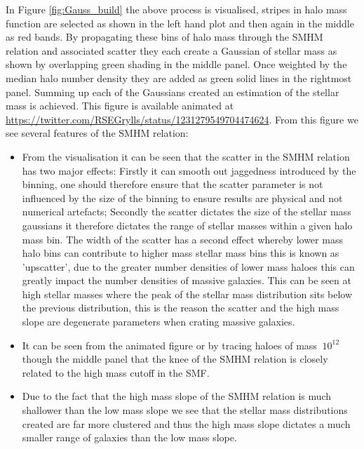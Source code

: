 In Figure \ref{fig:Gauss_build} the above process is visualised, stripes in halo mass function are selected as shown in the left hand plot and then again in the middle as red bands. By propagating these bins of halo mass through the SMHM relation and associated scatter they each create a Gaussian of stellar mass as shown by overlapping green shading in the middle panel. Once weighted by the median halo number density they are added as green solid lines in the rightmost panel. Summing up each of the Gaussians created an estimation of the stellar mass is achieved. This figure is available animated at \url{https://twitter.com/RSEGrylls/status/1231279549704474624}. From this figure we see several features of the SMHM relation:
\begin{itemize}
    \item From the visualisation it can be seen that the scatter in the SMHM relation has two major effects: Firstly it can smooth out jaggedness introduced by the binning, one should therefore ensure that the scatter parameter is not influenced by the size of the binning to ensure results are physical and not numerical artefacts; Secondly the scatter dictates the size of the stellar mass gaussians it therefore dictates the range of stellar masses within a given halo mass bin. The width of the scatter has a second effect whereby lower mass halo bins can contribute to higher mass stellar mass bins this is known as 'upscatter', due to the greater number densities of lower mass haloes this can greatly impact the number densities of massive galaxies. This can be seen at high stellar masses where the peak of the stellar mass distribution sits below the previous distribution, this is the reason the scatter and the high mass slope are degenerate parameters when crating massive galaxies.
    \item It can be seen from the animated figure or by tracing haloes of mass $~10^{12}$ though the middle panel that the knee of the SMHM relation is closely related to the high mass cutoff in the SMF.
    \item Due to the fact that the high mass slope of the SMHM relation is much shallower than the low mass slope we see that the stellar mass distributions created are far more clustered and thus the high mass slope dictates a much smaller range of galaxies than the low mass slope.
\end{itemize}

